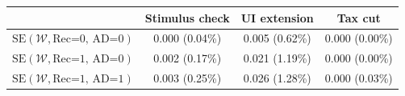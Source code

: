 \begin{tabular}{@{}lccc@{}}
\toprule
                          & Stimulus check      & UI extension    & Tax cut    \\  \midrule
$\mathrm{SE}(\mathcal{W}, \text{Rec=0, AD=0})$ & 0.000 (0.04\%)  & 0.005 (0.62\%)  & 0.000 (0.00\%)     \\
$\mathrm{SE}(\mathcal{W}, \text{Rec=1, AD=0})$ & 0.002 (0.17\%)  & 0.021 (1.19\%)  & 0.000 (0.00\%)     \\
$\mathrm{SE}(\mathcal{W}, \text{Rec=1, AD=1})$ & 0.003 (0.25\%)  & 0.026 (1.28\%)  & 0.000 (0.03\%)     \\ \bottomrule
\end{tabular}
